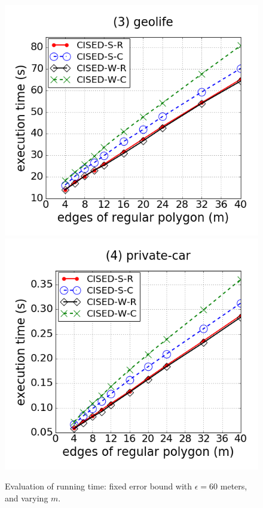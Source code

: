 \begin{figure}[tb!]
\includegraphics[scale = 0.240]{figures/Exp-M-e-60-time-geolife.png}
\includegraphics[scale = 0.240]{figures/Exp-M-e-60-time-private.png}
\vspace{-1ex}
\caption{\small Evaluation of running time: fixed error bound with $\epsilon=60$ meters, and varying $m$. }
\label{fig:m-time-e60}
\vspace{-1ex}
\end{figure}




